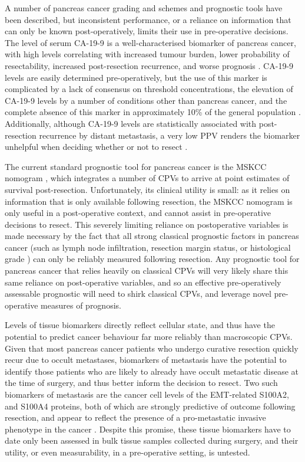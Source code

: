 \documentclass[dissertation.tex]{subfiles}
\begin{document}
A number of pancreas cancer grading and schemes and prognostic tools have been described, but inconsistent performance, or a reliance on information that can only be known post-operatively, limits their use in pre-operative decisions.  The level of serum \gls{CA-19-9} is a well-characterised biomarker of pancreas cancer, with high levels correlating with increased tumour burden, lower probability of resectability, increased post-resection recurrence, and worse prognosis \cite{Kim2011, Ballehaninna2012, Barugola2007, Lundin1994}.  \Gls{CA-19-9} levels are easily determined pre-operatively, but the use of this marker is complicated by a lack of consensus on threshold concentrations, the elevation of \gls{CA-19-9} levels by a number of conditions other than pancreas cancer, and the complete absence of this marker in approximately 10\% of the general population \cite{Ballehaninna2012}.  Additionally, although \gls{CA-19-9} levels are statistically associated with post-resection recurrence by distant metastasis, a very low \gls{PPV} renders the biomarker unhelpful when deciding whether or not to resect \cite{Kim2011}.

The current standard prognostic tool for pancreas cancer is the \gls{MSKCC} nomogram \cite{Brennan2004}, which integrates a number of \glspl{CPV} to arrive at point estimates of survival post-resection.  Unfortunately, its clinical utility is small: as it relies on information that is only available following resection, the \gls{MSKCC} nomogram is only useful in a post-operative context, and cannot assist in pre-operative decisions to resect.  This severely limiting reliance on postoperative variables is made necessary by the fact that all strong classical prognostic factors in pancreas cancer (such as lymph node infiltration, resection margin status, or histological grade \cite{Bilici2014}) can only be reliably measured following resection.  Any prognostic tool for pancreas cancer that relies heavily on classical \glspl{CPV} will very likely share this same reliance on post-operative variables, and so an effective pre-operatively assessable prognostic will need to shirk classical \glspl{CPV}, and leverage novel pre-operative measures of prognosis.

Levels of tissue biomarkers directly reflect cellular state, and thus have the potential to predict cancer behaviour far more reliably than macroscopic \glspl{CPV}.  Given that most pancreas cancer patients who undergo curative resection quickly recur due to occult metastases, biomarkers of metastasis have the potential to identify those patients who are likely to already have occult metastatic disease at the time of surgery, and thus better inform the decision to resect.  Two such biomarkers of metastasis are the cancer cell levels of the \gls{EMT}-related S100A2, and S100A4 proteins, both of which are strongly predictive of outcome following resection, and appear to reflect the presence of a pro-metastatic invasive phenotype in the cancer \cite{Biankin2008, Tsukamoto2013, Lee2014}.  Despite this promise, these tissue biomarkers have to date only been assessed in bulk tissue samples collected during surgery, and their utility, or even measurability, in a pre-operative setting, is untested.
\end{document}
